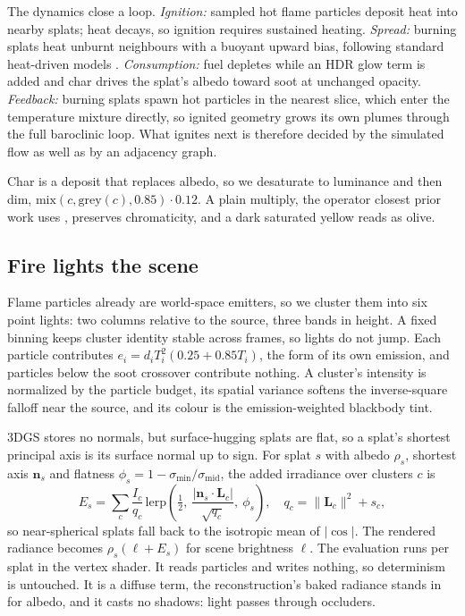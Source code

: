 \documentclass[acmtog,nonacm]{acmart}
\begin{document}
The dynamics close a loop. \emph{Ignition:} sampled hot flame particles deposit heat into nearby splats; heat decays, so ignition requires sustained heating. \emph{Spread:} burning splats heat unburnt neighbours with a buoyant upward bias, following standard heat-driven models \cite{pirk2017,hadrich2021}. \emph{Consumption:} fuel depletes while an HDR glow term is added and char drives the splat's albedo toward soot at unchanged opacity. \emph{Feedback:} burning splats spawn hot particles in the nearest slice, which enter the temperature mixture directly, so ignited geometry grows its own plumes through the full baroclinic loop. What ignites next is therefore decided by the simulated flow as well as by an adjacency graph.

Char is a deposit that replaces albedo, so we desaturate to luminance and then dim, $\mathrm{mix}(c,\mathrm{grey}(c),0.85)\cdot0.12$. A plain multiply, the operator closest prior work uses \cite{shen2026}, preserves chromaticity, and a dark saturated yellow reads as olive.

\subsection{Fire lights the scene}
\label{sec:light}
Flame particles already are world-space emitters, so we cluster them into six point lights: two columns relative to the source, three bands in height. A fixed binning keeps cluster identity stable across frames, so lights do not jump. Each particle contributes $e_i=d_iT_i^2(0.25+0.85T_i)$, the form of its own emission, and particles below the soot crossover contribute nothing. A cluster's intensity is normalized by the particle budget, its spatial variance softens the inverse-square falloff near the source, and its colour is the emission-weighted blackbody tint.

3DGS stores no normals, but surface-hugging splats are flat, so a splat's shortest principal axis is its surface normal up to sign. For splat $s$ with albedo $\rho_s$, shortest axis $\mathbf n_s$ and flatness $\phi_s=1-\sigma_{\min}/\sigma_{\mathrm{mid}}$, the added irradiance over clusters $c$ is
\begin{equation}
E_s=\sum_c\frac{I_c}{q_c}\,\mathrm{lerp}\!\left(\tfrac12,\ \frac{|\mathbf n_s\cdot\mathbf L_c|}{\sqrt{q_c}},\ \phi_s\right),\quad q_c=\|\mathbf L_c\|^2+s_c,
\label{eq:light}
\end{equation}
so near-spherical splats fall back to the isotropic mean of $|\cos|$. The rendered radiance becomes $\rho_s(\ell+E_s)$ for scene brightness $\ell$. The evaluation runs per splat in the vertex shader. It reads particles and writes nothing, so determinism is untouched. It is a diffuse term, the reconstruction's baked radiance stands in for albedo, and it casts no shadows: light passes through occluders.
\end{document}
